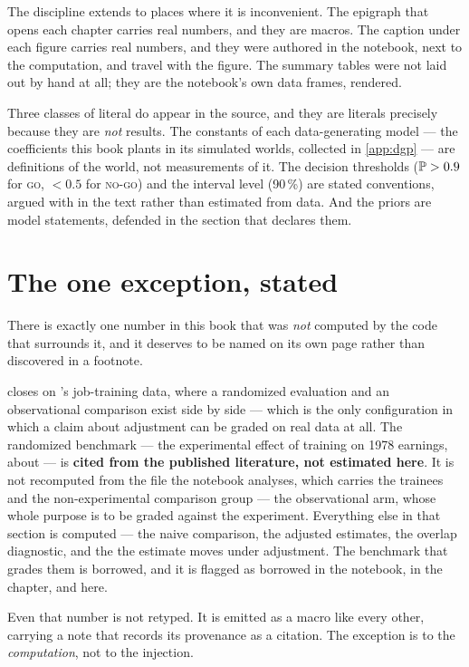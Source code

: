 The discipline extends to places where it is inconvenient. The epigraph that opens each chapter
carries real numbers, and they are macros. The caption under each figure carries real numbers, and
they were authored in the notebook, next to the computation, and travel with the figure. The
summary tables were not laid out by hand at all; they are the notebook's own data frames, rendered.

Three classes of literal do appear in the source, and they are literals precisely because they are
\emph{not} results. The constants of each data-generating model --- the coefficients this book
plants in its simulated worlds, collected in \cref{app:dgp} --- are definitions of the world, not
measurements of it. The decision thresholds ($\operatorname{\mathbb{P}} > 0.9$ for \textsc{go}, $< 0.5$ for
\textsc{no-go}) and the interval level (90\,\%) are stated conventions, argued with in the text
rather than estimated from data. And the priors are model statements, defended in the section that
declares them.

\section*{The one exception, stated}

There is exactly one number in this book that was \emph{not} computed by the code that surrounds
it, and it deserves to be named on its own page rather than discovered in a footnote.

 closes on \citet{lalonde1986}'s job-training data, where a randomized
evaluation and an observational comparison exist side by side --- which is the only configuration
in which a claim about adjustment can be graded on real data at all. The randomized benchmark ---
the experimental effect of training on 1978 earnings, about \usd{\nbZeroLlBenchmark} --- is
\textbf{cited from the published literature, not estimated here}. It is not recomputed from the
file the notebook analyses, which carries the trainees and the non-experimental comparison group
--- the observational arm, whose whole purpose is to be graded against the experiment. Everything
else in that section is computed --- the naive comparison, the adjusted estimates, the overlap
diagnostic, and the
\usd{\nbZeroLlSwing} the estimate moves under adjustment. The benchmark that grades them is
borrowed, and it is flagged as borrowed in the notebook, in the chapter, and here.

Even that number is not retyped. It is emitted as a macro like every other, carrying a note that
records its provenance as a citation. The exception is to the \emph{computation}, not to the
injection.

